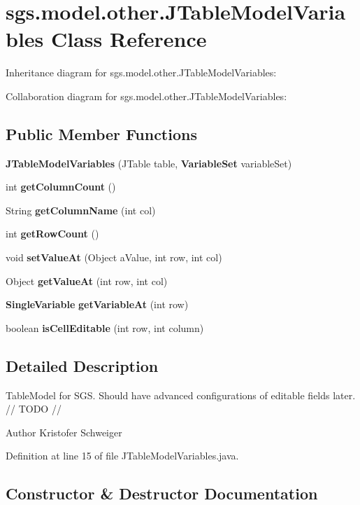 \section{sgs.\-model.\-other.\-J\-Table\-Model\-Variables Class Reference}
\label{classsgs_1_1model_1_1other_1_1_j_table_model_variables}


Inheritance diagram for sgs.\-model.\-other.\-J\-Table\-Model\-Variables\-:


Collaboration diagram for sgs.\-model.\-other.\-J\-Table\-Model\-Variables\-:
\subsection*{Public Member Functions}
\begin{DoxyCompactItemize}
\item 
{\bf J\-Table\-Model\-Variables} (J\-Table table, {\bf Variable\-Set} variable\-Set)
\item 
int {\bf get\-Column\-Count} ()
\item 
String {\bf get\-Column\-Name} (int col)
\item 
int {\bf get\-Row\-Count} ()
\item 
void {\bf set\-Value\-At} (Object a\-Value, int row, int col)
\item 
Object {\bf get\-Value\-At} (int row, int col)
\item 
{\bf Single\-Variable} {\bf get\-Variable\-At} (int row)
\item 
boolean {\bf is\-Cell\-Editable} (int row, int column)
\end{DoxyCompactItemize}


\subsection{Detailed Description}
Table\-Model for S\-G\-S. Should have advanced configurations of editable fields later. // T\-O\-D\-O //

\begin{DoxyAuthor}{Author}
Kristofer Schweiger 
\end{DoxyAuthor}


Definition at line 15 of file J\-Table\-Model\-Variables.\-java.



\subsection{Constructor \& Destructor Documentation}
